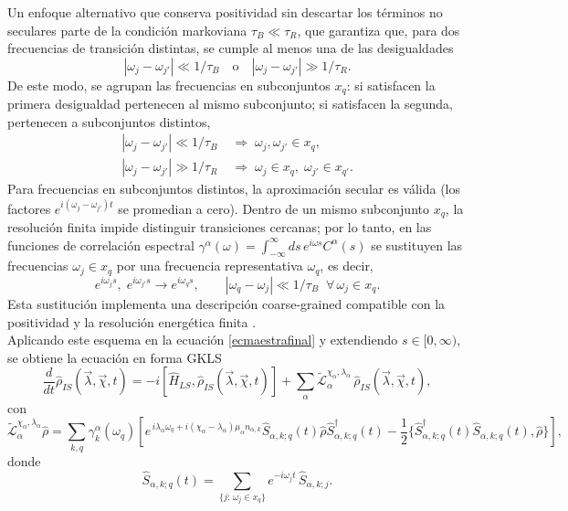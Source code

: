 Un enfoque alternativo que conserva positividad sin descartar los términos no seculares parte de la condición markoviana \(\tau_{B}\ll \tau_{R}\), que garantiza que, para dos frecuencias de transición distintas, se cumple al menos una de las desigualdades
\[
|\omega_j-\omega_{j'}|\ll 1/\tau_B
\quad\text{o}\quad
|\omega_j-\omega_{j'}|\gg 1/\tau_R.
\]
De este modo, se agrupan las frecuencias en subconjuntos \(x_q\): si satisfacen la primera desigualdad pertenecen al mismo subconjunto; si satisfacen la segunda, pertenecen a subconjuntos distintos,
\begin{align*}
    |\omega_{j}-\omega_{j'}| \ll 1/\tau_{B}  &\;\Rightarrow\; \omega_{j},\omega_{j'} \in x_{q}, \\
    |\omega_{j}-\omega_{j'}| \gg 1/\tau_{R}  &\;\Rightarrow\; \omega_{j} \in x_{q},\; \omega_{j'} \in x_{q'}.
\end{align*}
Para frecuencias en subconjuntos distintos, la aproximación secular es válida (los factores \(e^{i(\omega_j-\omega_{j'})t}\) se promedian a cero). Dentro de un mismo subconjunto \(x_q\), la resolución finita impide distinguir transiciones cercanas; por lo tanto, en las funciones de correlación espectral
\(\gamma^{\alpha}(\omega)=\int_{-\infty}^{\infty} ds\,e^{i\omega s}C^{\alpha}(s)\)
se sustituyen las frecuencias \(\omega_{j}\in x_q\) por una frecuencia representativa \(\omega_{q}\), es decir,
\[
    e^{i\omega_{j}s},\;e^{i\omega_{j'}s} \to e^{i\omega_{q}s},
    \qquad 
    |\omega_{q}-\omega_{j}|\ll 1/\tau_{B}\;\;\forall\,\omega_{j}\in x_{q}.
\]
Esta sustitución implementa una descripción coarse-grained compatible con la positividad y la resolución energética finita \cite{chruscinski2017brief}.
\\

Aplicando este esquema en la ecuación \eqref{ecmaestrafinal} y extendiendo \(s\in[0,\infty)\), se obtiene la ecuación en forma GKLS
\begin{equation}
    \frac{d}{dt}\hat{\rho}_{IS}(\vec{\lambda},\vec{\chi},t) 
    = -i[\hat{H}_{LS},\hat{\rho}_{IS}(\vec{\lambda},\vec{\chi},t)]
      + \sum_{\alpha}\tilde{\mathcal{L}}^{\chi_{\alpha},\lambda_{\alpha}}_{\alpha}\,
        \hat{\rho}_{IS}(\vec{\lambda},\vec{\chi},t),
    \label{ecmaestracounting}
\end{equation}
con
\begin{equation*}
    \tilde{\mathcal{L}}^{\chi_{\alpha},\lambda_{\alpha}}_{\alpha}\hat{\rho} 
    = \sum_{k,q}\gamma^{\alpha}_{k}(\omega_{q})
      \left[
        e^{\,i\lambda_{\alpha}\omega_{q} + i(\chi_{\alpha}-\lambda_{\alpha})\mu_{\alpha}n_{\alpha,k}}
        \hat{S}_{\alpha,k;q}(t)\hat{\rho}\hat{S}^{\dagger}_{\alpha,k;q}(t)
        - \frac{1}{2}\{\hat{S}^{\dagger}_{\alpha,k;q}(t)\hat{S}_{\alpha,k;q}(t),\hat{\rho}\}
      \right],
\end{equation*}
donde
\begin{equation*}
    \hat{S}_{\alpha,k;q}(t) = \sum_{\{j:\,\omega_{j}\in x_{q}\}} e^{-i\omega_{j}t}\,\hat{S}_{\alpha,k;j}.
\end{equation*}

